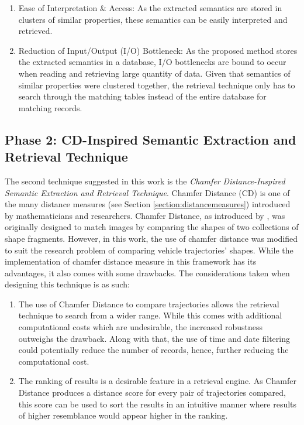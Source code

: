 \begin{enumerate}
    \item Ease of Interpretation \& Access: As the extracted semantics are stored in clusters of similar properties, these semantics can be easily interpreted and retrieved.
    \item Reduction of Input/Output (I/O) Bottleneck: As the proposed method stores the extracted semantics in a database, I/O bottlenecks are bound to occur when reading and retrieving large quantity of data. Given that semantics of similar properties were clustered together, the retrieval technique only has to search through the matching tables instead of the entire database for matching records.
\end{enumerate}


\subsection{Phase 2: CD-Inspired Semantic Extraction and Retrieval Technique}
The second technique suggested in this work is the \textit{Chamfer Distance-Inspired Semantic Extraction and Retrieval Technique}.
Chamfer Distance (CD) is one of the many distance measures (see Section \ref{section:distancemeasures}) introduced by mathematicians and researchers. Chamfer Distance, as introduced by \cite{barrow1977parametric}, was originally designed to match images by comparing the shapes of two collections of shape fragments.
However, in this work, the use of chamfer distance was modified to suit the research problem of comparing vehicle trajectories' shapes. While the implementation of chamfer distance measure in this framework has its advantages, it also comes with some drawbacks. The considerations taken when designing this technique is as such:

\begin{enumerate}
    \item The use of Chamfer Distance to compare trajectories allows the retrieval technique to search from a wider range. While this comes with additional computational costs which are undesirable, the increased robustness outweighs the drawback. Along with that, the use of time and date filtering could potentially reduce the number of records, hence, further reducing the computational cost.
    \item The ranking of results is a desirable feature in a retrieval engine. As Chamfer Distance produces a distance score for every pair of trajectories compared, this score can be used to sort the results in an intuitive manner where results of higher resemblance would appear higher in the ranking.
\end{enumerate}


